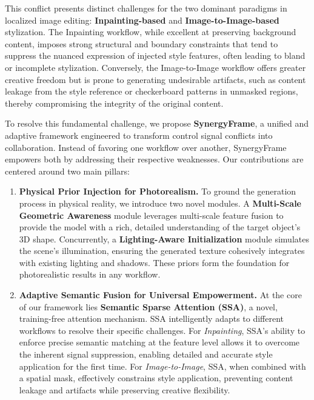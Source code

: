 \documentclass[letterpaper]{article} %
\begin{document}
This conflict presents distinct challenges for the two dominant paradigms in localized image editing: \textbf{Inpainting-based} and \textbf{Image-to-Image-based} stylization. The Inpainting workflow, while excellent at preserving background content, imposes strong structural and boundary constraints that tend to suppress the nuanced expression of injected style features, often leading to bland or incomplete stylization. Conversely, the Image-to-Image workflow offers greater creative freedom but is prone to generating undesirable artifacts, such as content leakage from the style reference or checkerboard patterns in unmasked regions, thereby compromising the integrity of the original content.

To resolve this fundamental challenge, we propose \textbf{SynergyFrame}, a unified and adaptive framework engineered to transform control signal conflicts into collaboration. Instead of favoring one workflow over another, SynergyFrame empowers both by addressing their respective weaknesses. Our contributions are centered around two main pillars:

\begin{enumerate}
    \item \textbf{Physical Prior Injection for Photorealism.} To ground the generation process in physical reality, we introduce two novel modules. A \textbf{Multi-Scale Geometric Awareness} module leverages multi-scale feature fusion to provide the model with a rich, detailed understanding of the target object's 3D shape. Concurrently, a \textbf{Lighting-Aware Initialization} module simulates the scene's illumination, ensuring the generated texture cohesively integrates with existing lighting and shadows. These priors form the foundation for photorealistic results in any workflow.

    \item \textbf{Adaptive Semantic Fusion for Universal Empowerment.} At the core of our framework lies \textbf{Semantic Sparse Attention (SSA)}, a novel, training-free attention mechanism. SSA intelligently adapts to different workflows to resolve their specific challenges. For \textit{Inpainting}, SSA's ability to enforce precise semantic matching at the feature level allows it to overcome the inherent signal suppression, enabling detailed and accurate style application for the first time. For \textit{Image-to-Image}, SSA, when combined with a spatial mask, effectively constrains style application, preventing content leakage and artifacts while preserving creative flexibility.
\end{enumerate}
\end{document}
